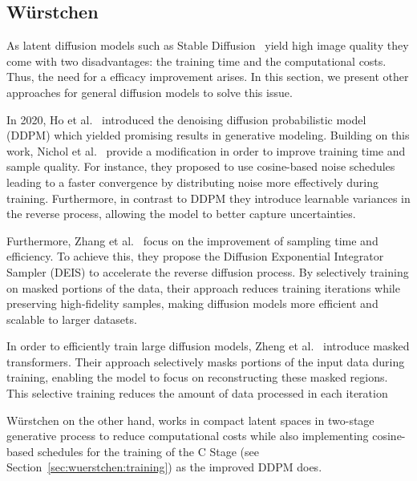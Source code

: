 \subsection{W\"urstchen}
As latent diffusion models such as Stable
Diffusion~\cite{rombach2022stablediffusion} yield high image quality they come
with two disadvantages: the training time and the computational costs. Thus,
the need for a efficacy improvement arises. In this section, we present other
approaches for general diffusion models to solve this issue.

In 2020, Ho et al.~\cite{ho2020denoisingdiffusionprobabilisticmodels} introduced
the  denoising diffusion probabilistic model (DDPM) which yielded promising
results in generative modeling. Building on this work, Nichol et
al.~\cite{Nichol2021ImprovedDenoisingDiffusionProbabilisticModels} provide a
modification in order to improve training time and sample quality. For
instance, they proposed to use cosine-based noise schedules leading to a faster
convergence by distributing noise more effectively during training.
Furthermore, in contrast to DDPM they introduce learnable variances in the
reverse process, allowing the model to better capture uncertainties.

Furthermore, Zhang et al.~\cite{zhang2023fastsamplingdiffusionmodels} focus on the
improvement of sampling time and efficiency. To achieve this, they propose the
Diffusion Exponential Integrator Sampler (DEIS) to accelerate the reverse
diffusion process. By selectively training on masked portions of the data,
their approach reduces training iterations while preserving high-fidelity
samples, making diffusion models more efficient and scalable to larger
datasets.

In order to efficiently train large diffusion models, Zheng et
al.~\cite{zheng2024fast} introduce masked transformers. Their approach
selectively masks portions of the input data during training, enabling the
model to focus on reconstructing these masked regions. This selective training
reduces the amount of data processed in each iteration

W\"urstchen on the other hand, works in compact latent spaces in two-stage
generative process to reduce computational costs while also implementing
cosine-based schedules for the training of the C Stage (see
Section~\ref{sec:wuerstchen:training}) as the improved DDPM does.